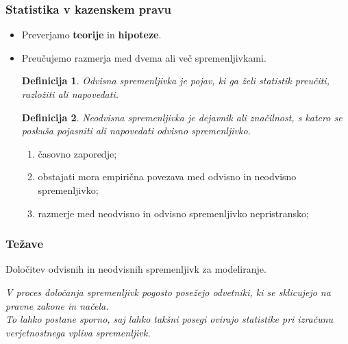 \documentclass{beamer}
\newtheorem{definicija}{Definicija}
\begin{document}
\begin{frame}
    \frametitle{Statistika v kazenskem pravu}
    \begin{itemize}
        \item Preverjamo \textbf{teorije} in \textbf{hipoteze}.
        \item Preučujemo razmerja med dvema ali več spremenljivkami.\\ \vspace{2mm}
         \begin{definicija}
            \textit{Odvisna spremenljivka} je pojav, ki ga želi statistik preučiti, razložiti ali napovedati.
        \end{definicija}
        \begin{definicija}
            \textit{Neodvisna spremenljivka} je dejavnik ali značilnost, s katero se poskuša pojasniti ali napovedati odvisno spremenljivko.
        \end{definicija}        

        \begin{enumerate}
            \item časovno zaporedje;
            \item obstajati mora empirična povezava med odvisno in neodvisno spremenljivko;
            \item razmerje med neodvisno in odvisno spremenljivko nepristransko;
        \end{enumerate}
    \end{itemize}
\end{frame}

\begin{frame}
   \frametitle{Težave}
   \begin{block}{}
       \centering
       Določitev odvisnih in neodvisnih spremenljivk za modeliranje.
   \end{block}\vspace{3mm}
   \textit{
   V proces določanja spremenljivk pogosto posežejo odvetniki, ki se sklicujejo na pravne zakone in načela. \\
   To lahko postane sporno, saj lahko takšni posegi ovirajo statistike pri izračunu verjetnostnega vpliva spremenljivk.}
\end{frame}

\end{document}
